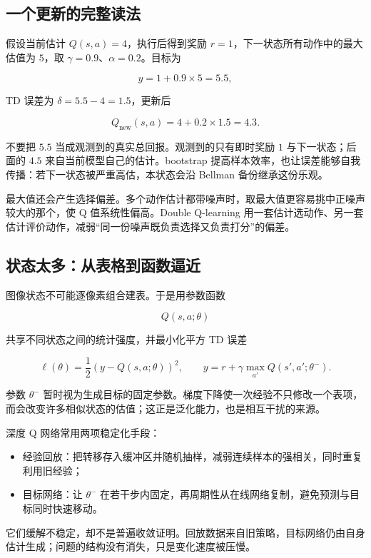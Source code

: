 \subsection{一个更新的完整读法}

假设当前估计 \(Q(s,a)=4\)，执行后得到奖励 \(r=1\)，下一状态所有动作中的最大估值为 \(5\)，取 \(\gamma=0.9\)、\(\alpha=0.2\)。目标为

\[
y=1+0.9\times5=5.5,
\]

TD 误差为 \(\delta=5.5-4=1.5\)，更新后

\[
Q_{\mathrm{new}}(s,a)
=4+0.2\times1.5
=4.3.
\]

不要把 \(5.5\) 当成观测到的真实总回报。观测到的只有即时奖励 \(1\) 与下一状态；后面的 \(4.5\) 来自当前模型自己的估计。bootstrap 提高样本效率，也让误差能够自我传播：若下一状态被严重高估，本状态会沿 Bellman 备份继承这份乐观。

最大值还会产生选择偏差。多个动作估计都带噪声时，取最大值更容易挑中正噪声较大的那个，使 Q 值系统性偏高。Double Q-learning 用一套估计选动作、另一套估计评价动作，减弱``同一份噪声既负责选择又负责打分''的偏差。

\subsection{状态太多：从表格到函数逼近}

图像状态不可能逐像素组合建表。于是用参数函数

\[
Q(s,a;\theta)
\]

共享不同状态之间的统计强度，并最小化平方 TD 误差

\[
\ell(\theta)
=
\frac12
\left(
y-Q(s,a;\theta)
\right)^2,
\qquad
y=r+\gamma\max_{a'}Q(s',a';\theta^-).
\]

参数 \(\theta^-\) 暂时视为生成目标的固定参数。梯度下降使一次经验不只修改一个表项，而会改变许多相似状态的估值；这正是泛化能力，也是相互干扰的来源。

深度 Q 网络常用两项稳定化手段：

\begin{itemize}
\tightlist
\item
  经验回放：把转移存入缓冲区并随机抽样，减弱连续样本的强相关，同时重复利用旧经验；
\item
  目标网络：让 \(\theta^-\) 在若干步内固定，再周期性从在线网络复制，避免预测与目标同时快速移动。
\end{itemize}

它们缓解不稳定，却不是普遍收敛证明。回放数据来自旧策略，目标网络仍由自身估计生成；问题的结构没有消失，只是变化速度被压慢。

